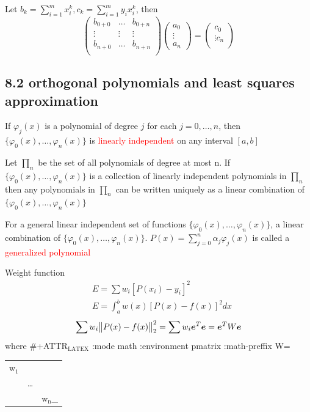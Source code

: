 \documentclass[11pt]{article}
\begin{document}
Let \(b_k=\displaystyle\sum_{i=1}^m x_i^k,
   c_k=\displaystyle\sum_{i=1}^my_ix_i^k\), then
\begin{equation*}
\begin{pmatrix}
b_{0+0} & \dots & b_{0+n}\\
\vdots & \vdots&\vdots\\
b_{n+0} & \dots & b_{n+n}\\
\end{pmatrix}
\begin{pmatrix}
a_0\\
\vdots\\
a_n
\end{pmatrix}=
\begin{pmatrix}
c_0\\
\vdots
c_n\\
\end{pmatrix}
\end{equation*}
\subsection{8.2 orthogonal polynomials and least squares approximation}
\label{sec:orgb9de06b}
\begin{theorem}
If $\varphi_j(x)$ is a polynomial of degree $j$ for each $j=0,\dots,n$, then 
$\{\varphi_0(x),\dots,\varphi_n(x)\}$ is \textcolor{red}{linearly independent} on
any interval $[a,b]$
\end{theorem}

\begin{theorem}
Let $\prod_n$ be the set of all polynomials of degree at most n. If
$\{\varphi_0(x),\dots,\varphi_n(x)\}$ is a collection of linearly independent
polynomials in $\prod_n$ then any polynomials in $\prod_n$ can be written
uniquely as a linear combination of $\{\varphi_0(x),\dots,\varphi_n(x)\}$
\end{theorem}

\begin{definition}
For a general linear independent set of functions $\{\varphi_0(x),\dots,\varphi_n(x)\}$,
a linear combination of $\{\varphi_0(x),\dots,\varphi_n(x)\}$.
$P(x)=\displaystyle\sum_{j=0}^n\alpha_j\varphi_j(x)$ is called a
\textcolor{red}{generalized polynomial} 
\end{definition}


Weight function
\begin{align*}
&E=\sum w_i[P(x_i)-y_i]^2\\
&E=\int_a^bw(x)[P(x)-f(x)]^2dx
\end{align*}
\begin{equation*}
\sum w_i\norm{P(x)-f(x)}_2^2=\sum w_i\boldsymbol{e}^T\boldsymbol{e}=\boldsymbol{e}^TW\boldsymbol{e}
\end{equation*}
where
\#+ATTR\(_{\text{LATEX}}\) :mode math :environment pmatrix :math-preffix W=
\begin{center}
\begin{tabular}{lll}
w\(_{\text{1}}\) &  & \\
 & \dots{} & \\
 &  & w\(_{\text{n}}\)\_\\
\end{tabular}
\end{center}
\end{document}
